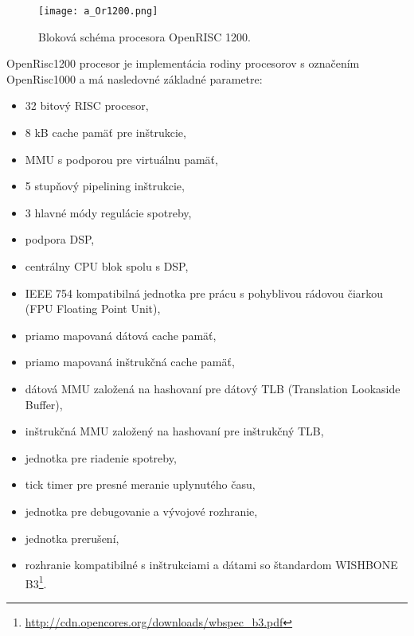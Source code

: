 \documentclass[12pt,a4wide,oneside,openright]{report}
\begin{document}


\begin{figure*}[h]
	\centering
	\texttt{[image: a\_Or1200.png]}
	\caption{Bloková schéma procesora OpenRISC 1200.\cite{openrisc}}
	\label{f:o_orisc2}
\end{figure*}
OpenRisc1200 procesor je implementácia rodiny procesorov s označením OpenRisc1000 a má nasledovné základné parametre:
\singlespacing
\begin{itemize}
\item 32 bitový RISC procesor,
\item 8 kB cache pamäť pre inštrukcie,
\item MMU s podporou pre virtuálnu pamäť,
\item 5 stupňový pipelining inštrukcie,
\item 3 hlavné módy regulácie spotreby,
\item podpora DSP,
\item centrálny CPU blok spolu s DSP,
\item IEEE 754 kompatibilná jednotka pre prácu s pohyblivou rádovou čiarkou (FPU Floating Point Unit),
\item priamo mapovaná dátová cache pamäť,
\item priamo mapovaná inštrukčná cache pamäť,
\item dátová MMU založená na hashovaní pre dátový TLB (Translation Lookaside Buffer),
\item inštrukčná MMU založený na hashovaní pre inštrukčný TLB,
\item jednotka pre riadenie spotreby,
\item tick timer pre presné meranie uplynutého času,
\item jednotka pre debugovanie a vývojové rozhranie,
\item jednotka prerušení,
\item rozhranie kompatibilné s inštrukciami a dátami so štandardom WISHBONE B3\footnote{\url{http://cdn.opencores.org/downloads/wbspec_b3.pdf}}.
\end{itemize}
\onehalfspacing
\end{document}
